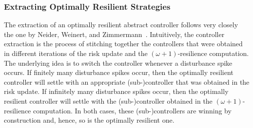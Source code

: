 \subsubsection{Extracting Optimally Resilient Strategies}
The extraction of an optimally resilient abstract controller follows very closely the one by Neider, Weinert, and Zimmermann~\cite{DBLP:conf/csl/NeiderW018}. %
Intuitively, the controller extraction is the process of stitching together the controllers that were obtained in different iterations of the risk update and the $(\omega+1)$-resilience computation.
The underlying idea is to switch the controller whenever a disturbance spike occurs.
If finitely many disturbance spikes occur, then the optimally resilient controller will settle with an appropriate \mbox{(sub-)}controller that was obtained in the risk update.
If infinitely many disturbance spikes occur, then the optimally resilient controller will settle with the \mbox{(sub-)}controller obtained in the $(\omega+1)$-resilience computation.
In both cases, these (sub-)controllers are winning by construction and, hence, so is the optimally resilient one.

